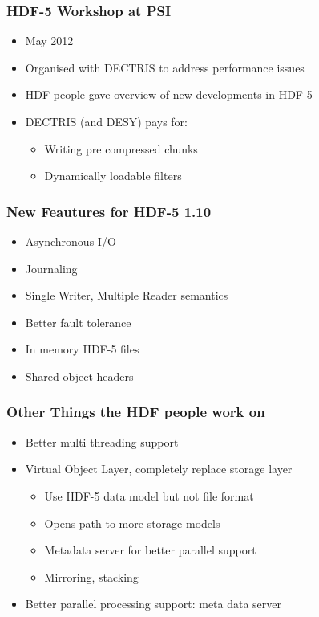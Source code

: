 \documentclass{beamer}
\begin{document}
\begin{frame}
\frametitle{HDF-5 Workshop at PSI}
\begin{itemize}
\item May 2012
\item Organised with DECTRIS to address performance issues
\item HDF people gave overview of new developments in HDF-5
\item DECTRIS (and DESY) pays for:
\begin{itemize}
\item Writing pre compressed chunks
\item Dynamically loadable filters
\end{itemize}
\end{itemize}
\end{frame}

\begin{frame}
\frametitle{New Feautures for HDF-5 1.10}
\begin{itemize}
\item Asynchronous I/O
\item Journaling
\item Single Writer, Multiple Reader semantics
\item Better fault tolerance
\item In memory HDF-5 files 
\item Shared object headers
\end{itemize}
\end{frame}

\begin{frame}
\frametitle{Other Things the HDF people work on}
\begin{itemize}
\item Better multi threading support
\item Virtual Object Layer, completely replace storage layer
\begin{itemize}
\item Use HDF-5 data model but not file format
\item Opens path to more storage models
\item Metadata server for better parallel support
\item Mirroring, stacking 
\end{itemize}
\item Better parallel processing support: meta data server
\end{itemize}
\end{frame}
\end{document}
